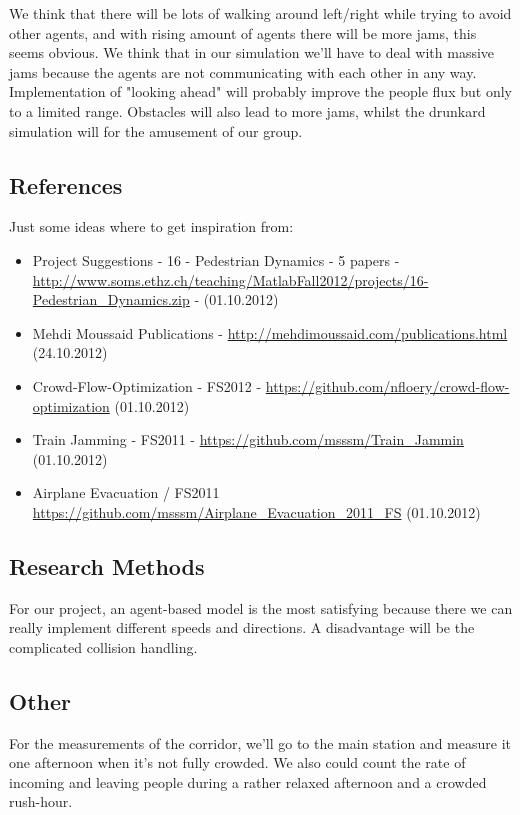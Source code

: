 We think that there will be lots of walking around left/right while trying to avoid other agents, and with rising amount of agents there will be more jams, this seems obvious. We think that in our simulation we'll have to deal with massive jams because the agents are not communicating with each other in any way. Implementation of "looking ahead" will probably improve the people flux but only to a limited range. Obstacles will also lead to more jams, whilst the drunkard simulation will for the amusement of our group.

\subsection*{References}

Just some ideas where to get inspiration from:
\begin{itemize}
 \item Project Suggestions - 16 - Pedestrian Dynamics - 5 papers - \url{http://www.soms.ethz.ch/teaching/MatlabFall2012/projects/16-Pedestrian_Dynamics.zip} - (01.10.2012)
 \item Mehdi Moussaid Publications - \url{http://mehdimoussaid.com/publications.html} (24.10.2012)
 \item Crowd-Flow-Optimization - FS2012 - \url{https://github.com/nfloery/crowd-flow-optimization} (01.10.2012)
 \item Train Jamming - FS2011 - \url{https://github.com/msssm/Train_Jammin} (01.10.2012)
 \item Airplane Evacuation / FS2011 \url{https://github.com/msssm/Airplane_Evacuation_2011_FS} (01.10.2012)
\end{itemize}
 
\subsection*{Research Methods}

For our project, an agent-based model is the most satisfying because there we can really implement different speeds and directions. A disadvantage will be the complicated collision handling.

\subsection*{Other}

For the measurements of the corridor, we'll go to the main station and measure it one afternoon when it's not fully crowded. We also could count the rate of incoming and leaving people during a rather relaxed afternoon and a crowded rush-hour.
